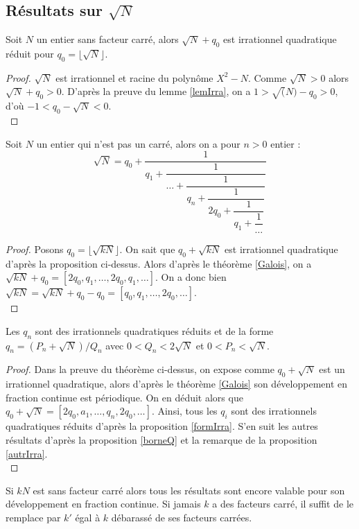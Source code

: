 \documentclass[a4paper]{article} %
\numberwithin{equation}{section}
\begin{document}
\subsection{Résultats sur $\sqrt{N}$}
\begin{prop}
Soit $N$ un entier sans facteur carré, alors $\sqrt{N} + q_0$ est irrationnel quadratique réduit pour $q_0 = \lfloor\sqrt{N}\rfloor$.
\end{prop}
\begin{proof}
$\sqrt{N}$ est irrationnel et racine du polynôme $X^2 - N$. Comme $\sqrt{N} > 0$ alors $\sqrt{N} + q_0 > 0$. D'après la preuve du lemme \ref{lemIrra}, on a $1 > \sqrt(N) - q_0 > 0$, d'où $-1 < q_0 - \sqrt{N} < 0$.\\
\end{proof}
\begin{thm}
\label{ncycl}
Soit $N$ un entier qui n'est pas un carré, alors on a pour $n > 0$ entier :
\[\sqrt{N} = q_0 + \dfrac{1}{q_1 + \dfrac{1}{\dots + \dfrac{1}{q_n + \dfrac{1}{ 2q_0 + \dfrac{1}{q_1 + \dfrac{1}{\dots}}}}}}\]
\end{thm}
\begin{proof}
Posons $q_0 = \lfloor\sqrt{kN}\rfloor$. On sait que $q_0 + \sqrt{kN}$ est irrationnel quadratique d'après la proposition ci-dessus. Alors d'après le théorème \ref{Galois}, on a $\sqrt{kN} + q_0 = [2q_0,q_1,\dots,2q_0,q_1,\dots]$. On a donc bien $\sqrt{kN} = \sqrt{kN} + q_0 - q_0 = [q_0,q_1,\dots,2q_0,\dots]$.\\
\end{proof}
\begin{cor}
Les $q_n$ sont des irrationnels quadratiques réduits et de la forme $q_n = (P_n + \sqrt{N})/Q_n$ avec $0 < Q_n < 2\sqrt{N}$ et $0 < P_n < \sqrt{N}$.
\end{cor}
\begin{proof}
Dans la preuve du théorème ci-dessus, on expose comme $q_0 + \sqrt{N}$ est un irrationnel quadratique, alors d'après le théorème \ref{Galois} son développement en fraction continue est périodique. On en déduit alors que $q_0 + \sqrt{N} = [2q_0, a_1,\dots, q_n,2q_0,\dots]$. Ainsi, tous les $q_i$ sont des irrationnels quadratiques réduits d'après la proposition \ref{formIrra}. S'en suit les autres résultats d'après la proposition \ref{borneQ} et la remarque de la proposition \ref{autrIrra}.\\
\end{proof}
\begin{rem}
Si $kN$ est sans facteur carré alors tous les résultats sont encore valable pour son développement en fraction continue. Si jamais $k$ a des facteurs carré, il suffit de le remplace par $k'$ égal à $k$ débarassé de ses facteurs carrées.
\end{rem}
\end{document}
